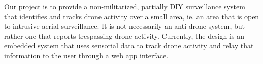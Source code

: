 Our project is to provide a non-militarized, partially DIY surveillance system that identifies and tracks drone activity over a small area, ie. an area that is open to intrusive aerial surveillance. It is not necessarily an anti-drone system, but rather one that reports trespassing drone activity. Currently, the design is an embedded system that uses sensorial data to track drone activity and relay that information to the user through a web app interface.
